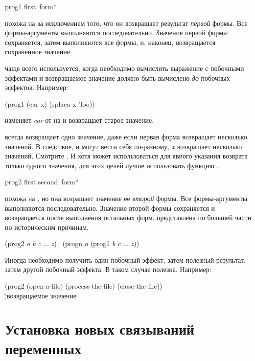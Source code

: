 \begin{defmac}
prog1 first {\,form}*

 похожа на  за исключением того, что он возвращает
результат \emph{первой} формы. Все формы-аргументы выполняются
последовательно. Значение первой формы сохраняется, затем выполняются все формы,
и, наконец, возвращается сохраненное значение.

 чаще всего используется, когда необходимо вычислить выражение с
побочными эффектами и возвращаемое значение должно быть вычислено \emph{до}
побочных эффектов.
Например:
\begin{lisp}
(prog1 (car x) (rplaca x 'foo))
\end{lisp}
изменяет \emph{car} от  на  и возвращает старое значение.

 всегда возвращает одно значение, даже если первая форма возвращает
несколько значений.
В следствие,  и  могут вести себя
по-разному, \emph{x} возвращает несколько значений. Смотрите .
И хотя  может использоваться для явного указания возврата только
одного значения, для этих целей лучше использовать функцию .
\end{defmac}

\begin{defmac}
prog2 first second {\,form}*

 похожа на , но она возращает значение ее \emph{второй}
формы. Все формы-аргументы выполняются последовательно. Значение второй формы
сохраняется и возвращается после выполнения остальных форм.
 представлена по большей части по историческим причинам.
\begin{lisp}
(prog2 \emph{a} \emph{b} \emph{c} ... \emph{z}) \EQ\ (progn \emph{a} (prog1 \emph{b} \emph{c} ... \emph{z}))
\end{lisp}
Иногда необходимо получить один побочный эффект, затем полезный результат, затем
другой побочный эффекта. В таком случае  полезна.
Например:
\begin{lisp}
(prog2 (open-a-file) (process-the-file) (close-the-file)) \\
\`;\textrm{возвращаемое значение }
\end{lisp}
\end{defmac}

\section{Установка новых связываний переменных}
\label{VAR-BINDING-SECTION}


